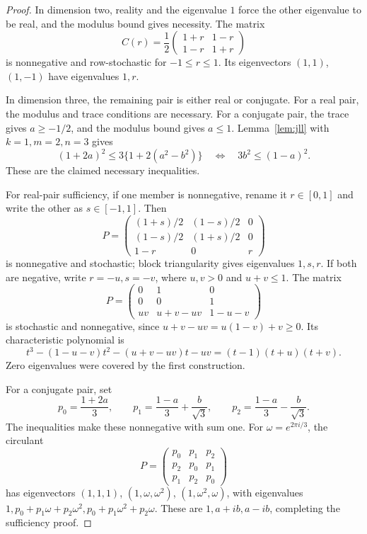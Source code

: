 \begin{proof}
In dimension two, reality and the eigenvalue \(1\) force the other
eigenvalue to be real, and the modulus bound gives necessity.
The matrix
\[
 C(r)=\frac12\begin{pmatrix}1+r&1-r\\1-r&1+r\end{pmatrix}
\]
is nonnegative and row-stochastic for \(-1\leq r\leq1\).
Its eigenvectors \((1,1)\), \((1,-1)\) have eigenvalues \(1,r\).

In dimension three, the remaining pair is either real or conjugate.
For a real pair, the modulus and trace conditions are necessary.
For a conjugate pair, the trace gives \(a\geq-1/2\), and the
modulus bound gives \(a\leq1\).
Lemma~\ref{lem:jll} with \(k=1,m=2,n=3\) gives
\[
 (1+2a)^2\leq3\{1+2(a^2-b^2)\}
 \quad\Longleftrightarrow\quad 3b^2\leq(1-a)^2 .
\]
These are the claimed necessary inequalities.

For real-pair sufficiency, if one member is nonnegative, rename it
\(r\in[0,1]\) and write the other as \(s\in[-1,1]\). Then
\[
 P=\begin{pmatrix}
 (1+s)/2&(1-s)/2&0\\
 (1-s)/2&(1+s)/2&0\\
 1-r&0&r
 \end{pmatrix}
\]
is nonnegative and stochastic; block triangularity gives eigenvalues
\(1,s,r\). If both are negative, write \(r=-u,s=-v\), where
\(u,v>0\) and \(u+v\leq1\). The matrix
\[
 P=\begin{pmatrix}
 0&1&0\\0&0&1\\uv&u+v-uv&1-u-v
 \end{pmatrix}
\]
is stochastic and nonnegative, since
\(u+v-uv=u(1-v)+v\geq0\). Its characteristic polynomial is
\[
 t^3-(1-u-v)t^2-(u+v-uv)t-uv=(t-1)(t+u)(t+v).
\]
Zero eigenvalues were covered by the first construction.

For a conjugate pair, set
\[
 p_0=\frac{1+2a}{3},\qquad
 p_1=\frac{1-a}{3}+\frac{b}{\sqrt3},\qquad
 p_2=\frac{1-a}{3}-\frac{b}{\sqrt3}.
\]
The inequalities make these nonnegative with sum one.
For \(\omega=e^{2\pi i/3}\), the circulant
\[
 P=\begin{pmatrix}p_0&p_1&p_2\\p_2&p_0&p_1\\p_1&p_2&p_0\end{pmatrix}
\]
has eigenvectors \((1,1,1)\), \((1,\omega,\omega^2)\),
\((1,\omega^2,\omega)\), with eigenvalues
\(1,p_0+p_1\omega+p_2\omega^2,p_0+p_1\omega^2+p_2\omega\).
These are \(1,a+ib,a-ib\), completing the sufficiency proof.
\end{proof}

